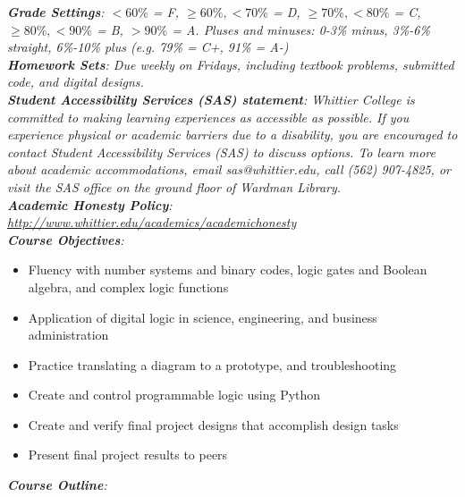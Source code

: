 \documentclass[10pt]{article}
\begin{document}
\textit{\textbf{Grade Settings}: $<60\%$ = F, $\geq 60\%,< 70\%$ = D, $\geq 70\%,<80\%$ = C, $\geq 80\%,<90\%$ = B, $>90\%$ = A.  Pluses and minuses: 0-3\% minus, 3\%-6\% straight, 6\%-10\% plus (e.g. 79\% = C+, 91\% = A-)} \\
\textit{\textbf{Homework Sets}: Due weekly on Fridays, including textbook problems, submitted code, and digital designs.} \\
\textit{\textbf{Student Accessibility Services (SAS) statement}: Whittier College is committed to making learning experiences as accessible as possible. If you experience physical or academic barriers due to a disability, you are encouraged to contact Student Accessibility Services (SAS) to discuss options. To learn more about academic accommodations, email sas@whittier.edu, call (562) 907-4825, or visit the SAS office on the ground floor of Wardman Library.} \\
\textit{\textbf{Academic Honesty Policy}: \url{http://www.whittier.edu/academics/academichonesty}} \\
\textit{\textbf{Course Objectives}:}
\begin{itemize}
\item Fluency with number systems and binary codes, logic gates and Boolean algebra, and complex logic functions
\item Application of digital logic in science, engineering, and business administration
\item Practice translating a diagram to a prototype, and troubleshooting
\item Create and control programmable logic using Python
\item Create and verify final project designs that accomplish design tasks
\item Present final project results to peers
\end{itemize}
\clearpage
\textit{\textbf{Course Outline}:}
\end{document}

